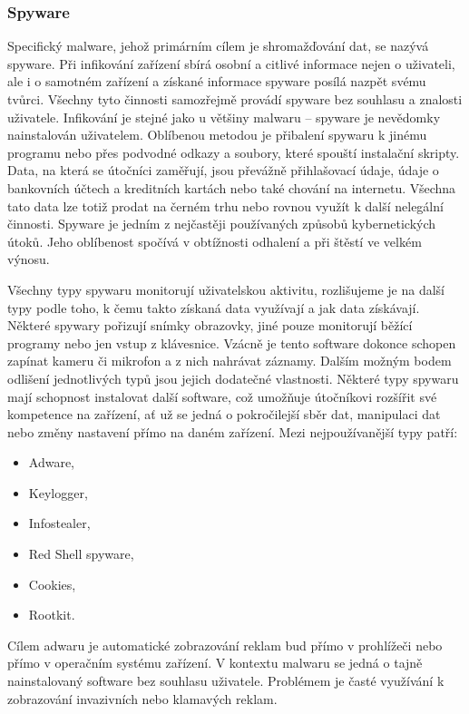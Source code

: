 \subsubsection{Spyware}
Specifický malware, jehož primárním cílem je shromažďování dat, se nazývá spyware.
Při infikování zařízení sbírá osobní a citlivé informace nejen o uživateli, ale i o samotném zařízení a získané informace spyware posílá nazpět svému tvůrci.
Všechny tyto činnosti samozřejmě provádí spyware bez souhlasu a znalosti uživatele.
Infikování je stejné jako u většiny malwaru -- spyware je nevědomky nainstalován uživatelem.
Oblíbenou metodou je přibalení spywaru k jinému programu nebo přes podvodné odkazy a soubory, které spouští instalační skripty.
Data, na která se útočníci zaměřují, jsou převážně přihlašovací údaje, údaje o bankovních účtech a kreditních kartách nebo také chování na internetu.
Všechna tato data lze totiž prodat na černém trhu nebo rovnou využít k další nelegální činnosti.
Spyware je jedním z nejčastěji používaných způsobů kybernetických útoků.
Jeho oblíbenost spočívá v obtížnosti odhalení a při štěstí ve velkém výnosu.\cite{avast_spyware, fortinet_spyware}

Všechny typy spywaru monitorují uživatelskou aktivitu, rozlišujeme je na další typy podle toho, k čemu takto získaná data využívají a jak data získávají.
Některé spywary pořizují snímky obrazovky, jiné pouze monitorují běžící programy nebo jen vstup z klávesnice.
Vzácně je tento software dokonce schopen zapínat kameru či mikrofon a z nich nahrávat záznamy.
Dalším možným bodem odlišení jednotlivých typů jsou jejich dodatečné vlastnosti.
Některé typy spywaru mají schopnost instalovat další software, což umožňuje útočníkovi rozšířit své kompetence na zařízení, ať už se jedná o pokročilejší sběr dat, manipulaci dat nebo změny nastavení přímo na daném zařízení.
Mezi nejpoužívanější typy patří\cite{avast_spyware, fortinet_spyware}:
\begin{itemize}
	\item Adware,
	\item Keylogger,
	\item Infostealer,
	\item Red Shell spyware,
	\item Cookies,
	\item Rootkit.
\end{itemize}

Cílem adwaru je automatické zobrazování reklam bud přímo v prohlížeči nebo přímo v operačním systému zařízení.
V kontextu malwaru se jedná o tajně nainstalovaný software bez souhlasu uživatele.
Problémem je časté využívání k zobrazování invazivních nebo klamavých reklam.\cite{avast_spyware}

